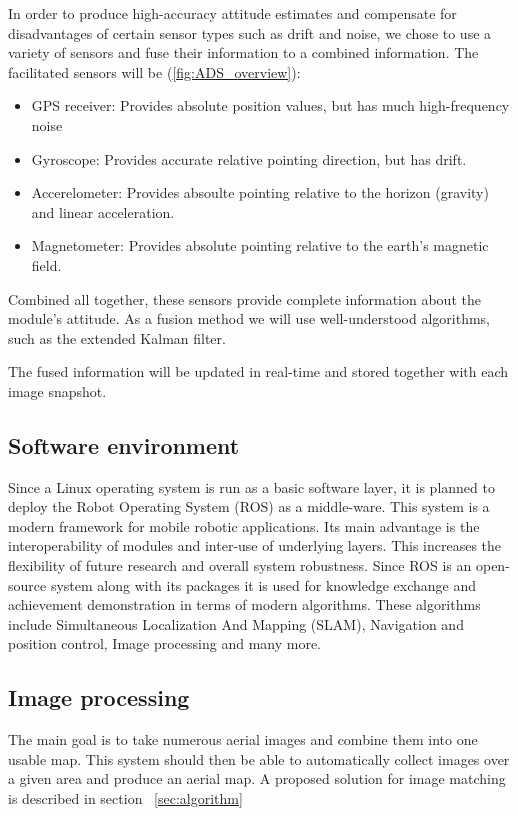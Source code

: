 \documentclass[fontsize=11pt,paper=a4,]{scrartcl}
\begin{document}
In order to produce high-accuracy attitude estimates and compensate for disadvantages of certain sensor types such as drift and noise, we chose to use a variety of sensors and fuse their information to a combined information.
The facilitated sensors will be (\ref{fig:ADS_overview}):
\begin{itemize}
\item GPS receiver: Provides absolute position values, but has much high-frequency noise
\item Gyroscope: Provides accurate relative pointing direction, but has drift.
\item Accerelometer: Provides absoulte pointing relative to the horizon (gravity) and linear acceleration.
\item Magnetometer: Provides absolute pointing relative to the earth's magnetic field.
\end{itemize}

Combined all together, these sensors provide complete information about the module's attitude.
As a fusion method we will use well-understood algorithms, such as the extended Kalman filter.

The fused information will be updated in real-time and stored together with each image snapshot.


\FloatBarrier
\subsection{Software environment}
Since a Linux operating system is run as a basic software layer, it is planned to deploy the Robot Operating System (ROS) as a middle-ware. This system is a modern framework
for mobile robotic applications. Its main advantage is the interoperability of modules and inter-use of underlying 
layers. This increases the flexibility of future research and overall system robustness. Since ROS is an open-source system along with its packages it is used for knowledge exchange and achievement demonstration in terms of modern algorithms. These algorithms include Simultaneous Localization
And Mapping (SLAM), Navigation and position control, Image processing and many more.  

\subsection{Image processing}
The main goal is to take numerous aerial images and combine them into one usable map. This system should then be able
to automatically collect images over a given area and produce an aerial map. A proposed solution
for image matching is described in section ~\ref{sec:algorithm}
\end{document}
